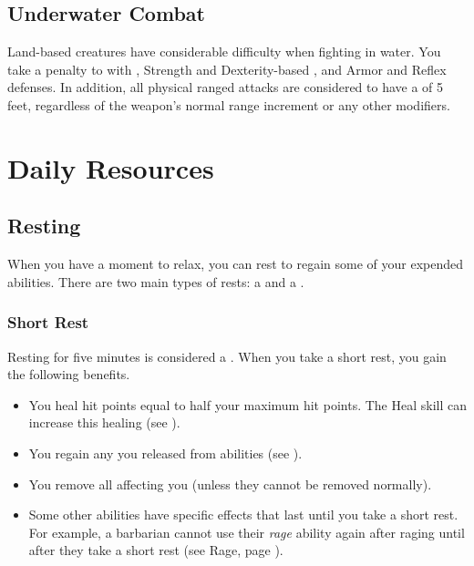     \subsection{Underwater Combat}\label{Underwater Combat}
        Land-based creatures have considerable difficulty when fighting in water.
        You take a  penalty to  with , Strength and Dexterity-based , and Armor and Reflex defenses.
        In addition, all physical ranged attacks are considered to have a  of 5 feet, regardless of the weapon's normal range increment or any other modifiers.

\section{Daily Resources}

    \subsection{Resting}\label{Resting}
        When you have a moment to relax, you can rest to regain some of your expended abilities.
        There are two main types of rests: a  and a .

        \subsubsection{Short Rest}\label{Short Rest}
            Resting for five minutes is considered a .
            When you take a short rest, you gain the following benefits.
            \begin{itemize}
                \item You heal hit points equal to half your maximum hit points.
                    The Heal skill can increase this healing (see ).
                \item You regain any  you released from  abilities (see ).
                \item You remove all  affecting you (unless they cannot be removed normally).
                \item Some other abilities have specific effects that last until you take a short rest.
                    For example, a barbarian cannot use their \textit{rage} ability again after raging until after they take a short rest (see Rage, page ).
            \end{itemize}

